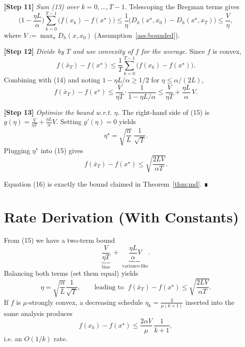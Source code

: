 \documentclass{article}
\newcommand{\D}[2]{D_{h}(#1,#2)}
\begin{document}
\noindent\textbf{[Step 11]} \emph{Sum (13) over $k=0,\dots,T-1$.}
Telescoping the Bregman terms gives
\[
\bigl(1-\frac{\eta L}{\alpha}\bigr)\sum_{k=0}^{T-1}\bigl(f(x_{k})-f(x^{\star})\bigr)
\le \frac{1}{\eta}\bigl(\D{x^{\star}}{x_{0}}-\D{x^{\star}}{x_{T}}\bigr)
\le \frac{V}{\eta},
\tag{14}
\]
where $V:=\max_{x}\D{x}{x_{0}}$ (Assumption~\ref{ass:bounded}).

\noindent\textbf{[Step 12]} \emph{Divide by $T$ and use convexity of $f$ for the average.}
Since $f$ is convex,
\[
f(\bar x_{T})-f(x^{\star})\le \frac{1}{T}\sum_{k=0}^{T-1}\bigl(f(x_{k})-f(x^{\star})\bigr).
\]
Combining with (14) and noting $1-\eta L/\alpha\ge 1/2$ for $\eta\le\alpha/(2L)$,
\[
f(\bar x_{T})-f(x^{\star})
\le \frac{V}{\eta T}\cdot\frac{1}{1-\eta L/\alpha}
\le \frac{V}{\eta T}+\frac{\eta L}{\alpha}\,V .
\tag{15}
\]

\noindent\textbf{[Step 13]} \emph{Optimize the bound w.r.t. $\eta$.}
The right‑hand side of (15) is $g(\eta)=\frac{V}{\eta T}+\frac{\eta L}{\alpha}V$.
Setting $g'(\eta)=0$ yields
\[
\eta^{\star}= \sqrt{\frac{\alpha}{L}}\;\frac{1}{\sqrt{T}}.
\]
Plugging $\eta^{\star}$ into (15) gives
\[
f(\bar x_{T})-f(x^{\star})\le
\sqrt{\frac{2L V}{\alpha T}} .
\tag{16}
\]

Equation (16) is exactly the bound claimed in Theorem~\ref{thm:md}.  ∎

\section*{Rate Derivation (With Constants)}
From (15) we have a two‑term bound
\[
\underbrace{\frac{V}{\eta T}}_{\text{bias}} \;+\;
\underbrace{\frac{\eta L}{\alpha}V}_{\text{variance‑like}} .
\]
Balancing both terms (set them equal) yields
\[
\eta = \sqrt{\frac{\alpha}{L}}\frac{1}{\sqrt{T}},\qquad
\text{leading to } \;
f(\bar x_{T})-f(x^{\star})\le
\sqrt{\frac{2L V}{\alpha T}} .
\]
If $f$ is $\mu$‑strongly convex, a decreasing schedule
$\eta_{k}= \frac{2}{\mu(k+1)}$ inserted into the same analysis
produces
\[
f(x_{k})-f(x^{\star})\le \frac{2\alpha V}{\mu}\,\frac{1}{k+1},
\]
i.e. an $O(1/k)$ rate.

\end{document}
